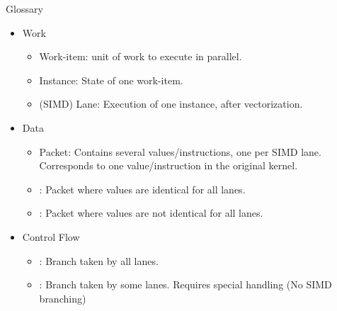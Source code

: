 
\begin{frame}{Glossary}

\begin{itemize}
    \item Work
    \begin{itemize}
        \item Work-item: unit of work to execute in parallel.
        \item Instance: State of one work-item.
        \item (SIMD) Lane: Execution of one instance, after vectorization.
        \end{itemize}
        
    \item Data
    \begin{itemize}
        \item Packet: Contains several values/instructions, one per SIMD lane. Corresponds to one value/instruction in the original kernel.
        \item {}: Packet where values are identical for all lanes.
        \item {}: Packet where values are not identical for all lanes.
        \end{itemize}

    \item Control Flow
    \begin{itemize}
        \item {}: Branch taken by all lanes.
        \item {}: Branch taken by some lanes. Requires special handling (No SIMD branching)
    \end{itemize}
\end{itemize}

\end{frame}
